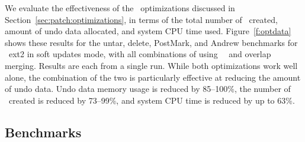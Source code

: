 \opttable{}

We evaluate the effectiveness of the \patch\ optimizations discussed in
Section~\ref{sec:patch:optimizations}, in terms of
%
the total number of \patches\ created, amount of undo data allocated,
and system CPU time used.
%
Figure~\ref{f:optdata} shows these results for the untar, delete,
PostMark, and Andrew benchmarks for \Kudos\ ext2 in soft updates mode,
with all combinations of using \nrb\ \patches\ and overlap merging.
Results are each from a single run.
%
While both optimizations work well alone, the combination of the two
is particularly effective at reducing the amount of undo data.
%
Undo data memory usage is reduced by 85--100\%,
%
the number of \patches\ created is reduced by 73--99\%,
%
and system CPU time is reduced by up to 63\%.
%

\begin{comment}
\begin{figure}[t]
\vspace{-0.5\baselineskip}
\centering{
\texttt{[image: rb\_patch\_size]}
}
\vspace{-0.5\baselineskip}
\caption{\label{fig:patchsize-histo} \Rb\ \patch\ size histogram for a sample
workload (extracting a large archive into ext2). All the \patches\ larger than
63 bytes have been optimized into \nrb\ \patches. \Rb\ \patches\ 4 bytes and
smaller account for about 51\% of all \rb\ \patches.}
\end{figure}
\end{comment}

\subsection {Benchmarks}
\label{sec:eval:bench}

